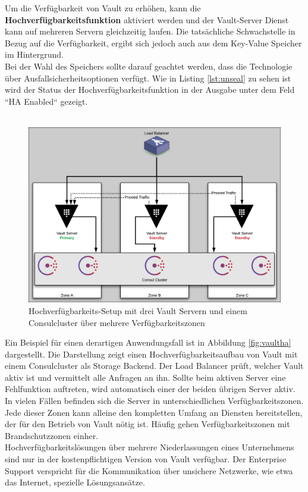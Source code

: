 \documentclass[
book,
a4paper,   
titlepage,  
halfparskip,
12pt        
]{scrartcl}
\begin{document}
\begin{onehalfspacing}
Um die Verfügbarkeit von Vault zu erhöhen, kann die \textbf{Hochverfügbarkeitsfunktion} aktiviert werden und der Vault-Server Dienst kann auf mehreren Servern gleichzeitig laufen. Die tatsächliche Schwachstelle in Bezug auf die Verfügbarkeit, ergibt sich jedoch auch aus dem Key-Value Speicher im Hintergrund.\\ Bei der Wahl des Speichers sollte darauf geachtet werden, dass die Technologie über Ausfallsicherheitsoptionen verfügt. Wie in Listing \vref{lst:unseal} zu sehen ist wird der Status der Hochverfügbarkeitsfunktion in der Ausgabe unter dem Feld ``HA Enabled`` gezeigt.\\
\\

\begin{figure}[h]
	\centering
	\includegraphics[width=1\linewidth]{vaultha.png}
	\caption[Vault High Availability]{Hochverfügbarkeits-Setup mit drei Vault Servern und einem Consulcluster über mehrere Verfügbarkeitszonen\cite{vaultha}}
	\label{fig:vaultha}
\end{figure}

Ein Beispiel für einen derartigen Anwendungsfall ist in Abbildung \vref{fig:vaultha} dargestellt. Die Darstellung zeigt einen Hochverfügbarkeitsaufbau von Vault mit einem Consulcluster als Storage Backend. Der Load Balancer prüft, welcher Vault aktiv ist und vermittelt alle Anfragen an ihn. Sollte beim aktiven Server eine Fehlfunktion auftreten, wird automatisch einer der beiden übrigen Server aktiv. In vielen Fällen befinden sich die Server in unterschiedlichen Verfügbarkeitszonen. Jede dieser Zonen kann alleine den kompletten Umfang an Diensten bereitstellen, der für den Betrieb von Vault nötig ist. Häufig gehen Verfügbarkeitszonen mit Brandschutzzonen einher.\\Hochverfügbarkeitslösungen über mehrere Niederlassungen eines Unternehmens sind nur in der kostenpflichtigen Version von Vault verfügbar. Der Enterprise Support verspricht für die Kommunikation über unsichere Netzwerke, wie etwa das Internet, spezielle Lösungsansätze\cite{enterprise}.
 

\end{onehalfspacing}
\end{document}
